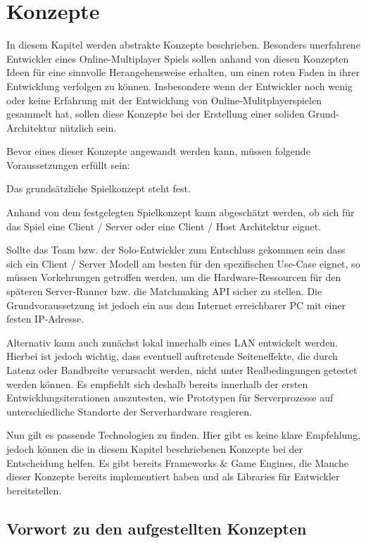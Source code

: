 \chapter{Konzepte}
\label{sec:konzepte}

In diesem Kapitel werden abstrakte Konzepte beschrieben. Besonders unerfahrene Entwickler eines Online-Multiplayer Spiels sollen anhand von diesen Konzepten Ideen für eine sinnvolle Herangehensweise erhalten, um einen roten Faden in ihrer Entwicklung verfolgen zu können. Insbesondere wenn der Entwickler noch wenig oder keine Erfahrung mit der Entwicklung von Online-Mulitplayerspielen gesammelt hat, sollen diese Konzepte bei der Erstellung einer soliden Grund-Architektur nützlich sein.

Bevor eines dieser Konzepte angewandt werden kann, müssen folgende Voraussetzungen erfüllt sein:

Das grundsätzliche Spielkonzept steht fest.

Anhand von dem festgelegten Spielkonzept kann abgeschätzt werden, ob sich für das Spiel eine Client / Server oder eine Client / Host Architektur eignet.

Sollte das Team bzw. der Solo-Entwickler zum Entschluss gekommen sein dass sich ein Client / Server Modell am besten für den spezifischen Use-Case eignet, so müssen Vorkehrungen getroffen werden, um die Hardware-Ressourcen für den späteren Server-Runner bzw. die Matchmaking API sicher zu stellen. Die Grundvoraussetzung ist jedoch ein aus dem Internet erreichbarer PC mit einer festen IP-Adresse. 

Alternativ kann auch zunächst lokal innerhalb eines LAN \cite{Wikipedia.2022} entwickelt werden. Hierbei ist jedoch wichtig, dass eventuell auftretende Seiteneffekte, die durch Latenz \cite{Wikipedia.2022b} oder Bandbreite \cite{Wikipedia.2019b} verursacht werden, nicht unter Realbedingungen getestet werden können. Es empfiehlt sich deshalb bereits innerhalb der ersten Entwicklungsiterationen auszutesten, wie Prototypen für Serverprozesse auf unterschiedliche Standorte der Serverhardware reagieren. 

Nun gilt es passende Technologien zu finden. Hier gibt es keine klare Empfehlung, jedoch können die in diesem Kapitel beschriebenen Konzepte bei der Entscheidung helfen. Es gibt bereits Frameworks \& Game Engines, die Manche dieser Konzepte bereits implementiert haben und als Libraries für Entwickler bereitstellen.

\cite{MFatihMAR.2021}

\section{Vorwort zu den aufgestellten Konzepten}

